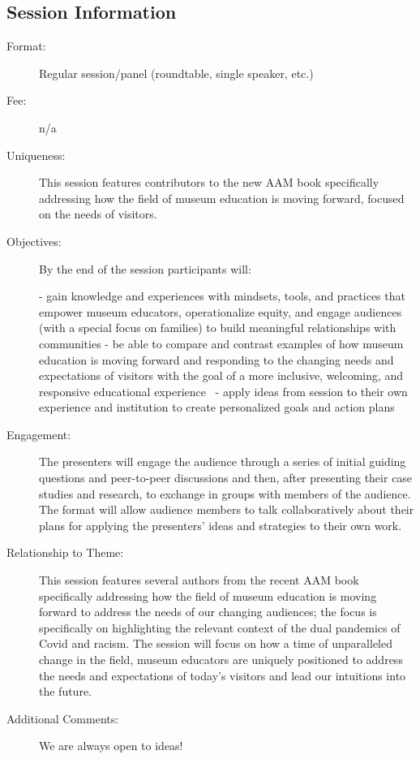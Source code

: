 \documentclass{report}
\begin{document}
              \subsection*{Session Information}
                \begin{description}
                  \item [Format:] Regular session/panel (roundtable, single speaker, etc.)
							    
								  \item [Fee:]n/a
							     
							    \item [Uniqueness:]This session features contributors to the new AAM book specifically addressing how the field of museum education is moving forward, focused on the needs of visitors.
							    \item [Objectives:]By the end of the session participants will:

- gain knowledge and experiences with mindsets, tools, and practices that empower museum educators, operationalize equity, and engage audiences (with a special focus on families) to build meaningful relationships with communities
- be able to compare and contrast examples of how museum education is moving forward and responding to the changing needs and expectations of visitors with the goal of a more inclusive, welcoming, and responsive educational experience 
- apply ideas from session to their own experience and institution to create personalized goals and action plans
							    \item [Engagement:]The presenters will engage the audience through a series of initial guiding questions and peer-to-peer discussions and then, after presenting their case studies and research, to exchange in groups with members of the audience. The format will allow audience members to talk collaboratively about their plans for applying the presenters’ ideas and strategies to their own work.
							    \item [Relationship to Theme:]This session features several authors from the recent AAM book specifically addressing how the field of museum education is moving forward to address the needs of our changing audiences; the focus is specifically on highlighting the relevant context of the dual pandemics of Covid and racism. The session will focus on how a time of unparalleled change in the field, museum educators are uniquely positioned to address the needs and expectations of today’s visitors and lead our intuitions into the future.
							    
                    \item [Additional Comments: ]We are always open to ideas!

                \end{description}
\end{document}
